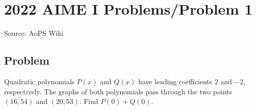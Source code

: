 \documentclass[12pt]{article}
\begin{document}
\section*{{2022 AIME I Problems/Problem 1}}
Source: AoPS Wiki

\subsection*{Problem}
Quadratic polynomials $P(x)$ and $Q(x)$ have leading coefficients $2$ and $-2,$ respectively. The graphs of both polynomials pass through the two points $(16,54)$ and $(20,53).$ Find $P(0) + Q(0).$
\end{document}
